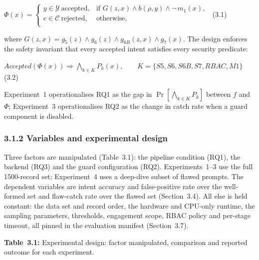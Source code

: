 \documentclass[
]{article}
\begin{document}
\(\Phi(x) = \left\{ \begin{matrix}
y \in \mathcal{Y}\ \text{accepted}, & \text{if\ }G(z,x) \land b(\rho,y) \land \neg\, m_{1}(x), \\
e \in \mathcal{C}\ \text{rejected}, & \text{otherwise,} \\
\end{matrix} \right.\ \) (3.1)

where
\(G(z,x) = g_{5}(z) \land g_{6}(z) \land g_{6B}(z,x) \land g_{7}(x)\).
The design enforces the safety invariant that every accepted intent
satisfies every security predicate:

\(Accepted\left( \Phi(x) \right) \Rightarrow \bigwedge_{k \in K}P_{k}(x),\quad\quad K = \{ S5,S6,S6B,S7,RBAC,M1\}\)
(3.2)

Experiment~1 operationalises RQ1 as the gap in
\(\Pr\left\lbrack \bigwedge_{k \in K}P_{k} \right\rbrack\) between \(f\)
and \(\Phi\); Experiment~3 operationalises RQ2 as the change in catch
rate when a guard component is disabled.

\hypertarget{variables-and-experimental-design}{%
\subsubsection{3.1.2 Variables and experimental
design}\label{variables-and-experimental-design}}

Three factors are manipulated (Table~3.1): the pipeline condition (RQ1),
the backend (RQ3) and the guard configuration (RQ2). Experiments~1--3
use the full 1500-record set; Experiment~4 uses a deep-dive subset of
flawed prompts. The dependent variables are intent accuracy and
false-positive rate over the well-formed set and flaw-catch rate over
the flawed set (Section~3.4). All else is held constant: the data set
and record order, the hardware and CPU-only runtime, the sampling
parameters, thresholds, engagement scope, RBAC policy and per-stage
timeout, all pinned in the evaluation manifest (Section~3.7).

\protect\hypertarget{_Toc900046}{}{}\textbf{Table~3.1:} Experimental
design: factor manipulated, comparison and reported outcome for each
experiment.
\end{document}
